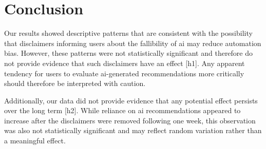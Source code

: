 \documentclass[sigconf,natbib=false]{acmart}
\begin{document}
\section{Conclusion}





Our results showed descriptive patterns that are consistent with the possibility that disclaimers informing users about the fallibility of \Gls{ai} may reduce automation bias. However, these patterns were not statistically significant and therefore do not provide evidence that such disclaimers have an effect [\gls{h1}]. Any apparent tendency for users to evaluate \Gls{ai}-generated recommendations more critically should therefore be interpreted with caution. 

Additionally, our data did not provide evidence that any potential effect persists over the long term [\gls{h2}]. While reliance on \Gls{ai} recommendations appeared to increase after the disclaimers were removed following one week, this observation was also not statistically significant and may reflect random variation rather than a meaningful effect.
\end{document}
